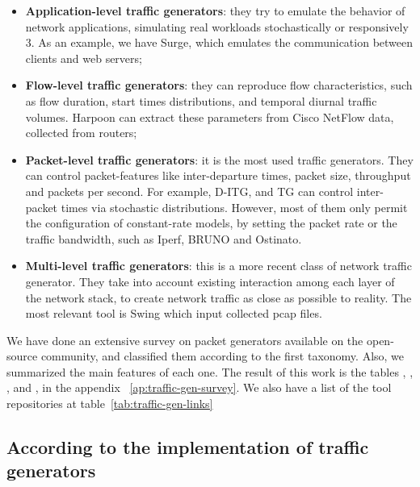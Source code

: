 \begin{itemize}

\item \textbf{Application-level traffic generators}: they try to emulate the behavior of network applications, simulating real workloads stochastically or responsively 3. As an example, we have Surge, which emulates the communication between clients and web
servers;

\item \textbf{Flow-level traffic generators}: they can reproduce flow characteristics, such as flow duration, start times distributions, and temporal diurnal traffic volumes. Harpoon can extract these parameters from Cisco NetFlow data, collected from routers;

\item \textbf{Packet-level traffic generators}: it is the most used traffic generators. They can control packet-features like inter-departure times, packet size, throughput and packets per second. For example, D-ITG\cite{ditg-paper}, and TG\cite{web-tg} can control inter-packet times via stochastic distributions. However, most of them only permit the configuration of constant-rate models, by setting the packet rate or the traffic bandwidth, such as Iperf\cite{web-iperf}, BRUNO\cite{bruno-paper} and Ostinato\cite{web-ostinato}.

\item \textbf{Multi-level traffic generators}: this is a more recent class of network traffic generator. They take into account existing interaction among each layer of the network stack, to create network traffic as close as possible to reality. The most relevant tool is Swing\cite{swing-paper} which input collected pcap files. 

\end{itemize}


We have done an extensive survey on packet generators available on the open-source community, and classified them according to the first taxonomy. Also, we summarized the main features of each one. The result of this work is the tables \label{tab:app-level-tg}, \label{tab:multi-level-tg}, \label{tab:packet-level-tg}, and \label{tab:replay-tg}, in the appendix ~\ref{ap:traffic-gen-survey}. We also have a list of the tool repositories at table~\ref{tab:traffic-gen-links}


\subsection{According to the implementation of traffic generators}

